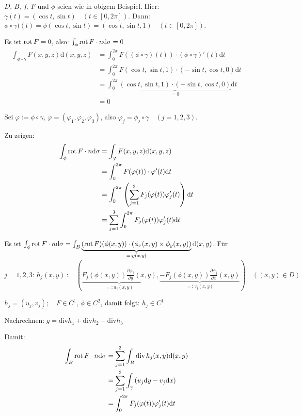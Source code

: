 \documentclass[a4paper,twoside,DIV15,BCOR12mm,chapterprefix=true,headings=onelinechapter]{scrbook}
\begin{document}
\begin{beispiel}
\(D,\,B,\,f,\,F\) und \(\phi\) seien wie in obigem Beispiel.
Hier: \(\gamma(t)=(\cos t,\sin t)\quad(t\in [0,2\pi])\). 
Dann: \(\phi\circ\gamma)(t)=\phi(\cos t, \sin t)=(\cos t, \sin t, 1)\quad(t\in [0,2\pi])\).

Es ist \(\mathop{\rm rot}\nolimits F=0\), also: \(\int_{\phi}{\mathop{\rm rot}\nolimits F\cdot n\mathrm{d}\sigma}=0\)
\begin{align*}
\int_{\phi\circ\gamma}{F(x,y,z)\mathrm{d}(x,y,z)}&=
    \int_{0}^{2\pi}{F((\phi\circ\gamma)(t))\cdot(\phi\circ\gamma)'(t)\mathrm{d}t}\\
&=\int_{0}^{2\pi}{F(\cos t,\sin t, 1)\cdot (-\sin t,\cos t,0)\mathrm{d}t}\\
&=\int_{0}^{2\pi}{\underbrace{(\cos t,\sin t,1)\cdot (-\sin t,\cos t,0)}_{=0}\mathrm{d}t}\\
&=0
\end{align*}
\end{beispiel}

\begin{beweis}
Sei \(\varphi:=\phi\circ\gamma,\,\varphi=(\varphi_{1},\varphi_{2},\varphi_{3})\), also 
    \(\varphi_{j}=\phi_{j}\circ\gamma\quad(j=1,2,3)\).

Zu zeigen:
\begin{align*}
\int_{\phi}{\mathop{\rm rot}\nolimits F\cdot n\mathrm{d}\sigma}
    &=\int_{\varphi}{F(x,y,z)\mathrm{d}(x,y,z)}\\
    &=\int_{0}^{2\pi}{F(\varphi(t))\cdot\varphi'(t)\mathrm{d}t}\\
    &=\int_{0}^{2\pi}{\left(\sum_{j=1}^{3}{F_{j}(\varphi(t))\varphi_{j}'(t)}\right)\mathrm{d}t}\\
    &=\sum_{j=1}^{3}{\int_{0}^{2\pi}{F_{j}(\varphi(t))\varphi_{j}'(t)\mathrm{d}t}}
\end{align*}

Es ist \(\int_{\phi}{\mathop{\rm rot}\nolimits F\cdot n\mathrm{d}\sigma}=\int_{B}{\underbrace{(\mathop{\rm rot}\nolimits F)(\phi(x,y))\cdot(\phi_{x}(x,y)\times\phi_{y}(x,y))}_{=:g(x,y)}\mathrm{d}(x,y)}\).
F\"ur \(j=1,2,3:\,h_{j}(x,y):=(\underbrace{F_{j}(\phi(x,y))\frac{\partial\phi_{j}}{\partial y}(x,y)}_{=:u_{j}(x,y)},\underbrace{-F_{j}(\phi(x,y))\frac{\partial\phi_{j}}{\partial x}(x,y)}_{=:v_{j}(x,y)})\quad((x,y)\in D)\)


\(h_{j}=(u_{j},v_{j});\quad F\in C^{1},\,\phi\in C^{2}\), damit folgt: \(h_{j}\in C^{1}\)

Nachrechnen: \(g=\mathrm{div} h_{1}+\mathrm{div} h_{2}+\mathrm{div} h_{3}\)

Damit:
\begin{align*}
\int_{B}{\mathop{\rm rot}\nolimits F\cdot n\mathrm{d}\sigma}
    &=\sum_{j=1}^{3}{\int_{B}{\mathrm{div}\,h_{j}(x,y)\mathrm{d}(x,y)}}\\
    &=\sum_{j=1}^{3}{\int_{\gamma}{(u_{j}\mathrm{d}y-v_{j}\mathrm{d}x)}}\\
    &=\int_{0}^{2\pi}{F_{j}(\varphi(t))\varphi_{j}'(t)\mathrm{d}t}
\end{align*}
\end{beweis}
\end{document}
